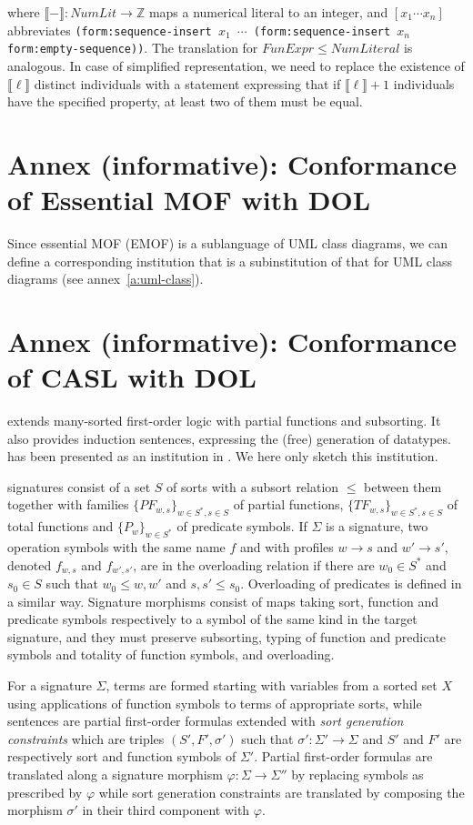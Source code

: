 \documentclass[10pt,fleqn,%
\ifpretendfinal
final%
\else
draft%
\fi,
]{scrreprt}
\newcommand{\infannex}[1]{ \chapter{Annex (informative): #1} }
\newcommand{\ZZ}{\mathbb{Z}}
\newcommand{\sem}[1]{\mathopen\llbracket#1\mathclose\rrbracket}
\begin{document}
%
where $\sem{-} : \mathit{NumLit} \to \ZZ$ maps a numerical literal
to an integer, and $[x_1\cdots x_n]$ abbreviates \texttt{(form:sequence-insert $x_1$ $\cdots$ (form:sequence-insert $x_n$ form:empty-sequence))}.
The translation for  $\mathit{FunExpr} \leq \mathit{NumLiteral}$
is analogous. In case of simplified representation, we need to replace
the existence of $\sem{\ell}$ distinct individuals with a statement
expressing that if $\sem{\ell}+1$ individuals have the specified property,
at least two of them must be equal.


\infannex{Conformance of Essential MOF with DOL}\label{a:EMOF}

Since essential MOF (EMOF) is a sublanguage of UML class diagrams,
we can define a corresponding institution that is a subinstitution
of that for UML class diagrams (see annex~\ref{a:uml-class}).


\infannex{Conformance of CASL with DOL}\label{a:casl}


\CASL \cite{CASL-RM} extends many-sorted first-order logic with
partial functions and subsorting.  It also provides induction
sentences, expressing the (free) generation of datatypes.  \CASL has
been presented as an institution in \cite{Mossakowski02,CASL-RM}. We
here only sketch this institution.

\CASL signatures consist of a set $S$ of sorts with a subsort relation $\leq$ between them
together with
families $\{PF_{w,s}\}_{w\in S^*, s\in S}$ of partial functions,
$\{TF_{w,s}\}_{w\in S^*, s\in S}$ of total functions and
$\{P_w\}_{w\in S^*}$ of predicate symbols. 
If $\Sigma$ is a signature, 
two operation symbols with the same name $f$ and with profiles
$w\rightarrow s$ and $w'\rightarrow s'$, denoted $f_{w,s}$ and $f_{w',s'}$, are in the
overloading relation if there are $w_0\in S^*$ and $s_0\in S$ such
that $w_0\leq w, w'$ and $s,s' \leq s_0$. Overloading of predicates is defined in a similar way.
Signature morphisms consist of maps taking sort, function and predicate symbols
respectively to a symbol of the same kind in the target signature, and they 
must preserve subsorting, typing of function and predicate symbols and totality of function symbols,
 and overloading. 

For a signature $\Sigma$, terms are formed starting with
variables from a sorted set $X$ using 
applications of function symbols to terms of appropriate sorts, while
sentences are partial first-order formulas extended with
\emph{sort generation constraints} which are triples $(S', F', \sigma')$ such that 
$\sigma':\Sigma'\rightarrow\Sigma$ and $S'$ and $F'$ are respectively sort and function symbols of
$\Sigma'$. 
Partial first-order formulas are translated along a signature morphism 
$\varphi:\Sigma\rightarrow\Sigma''$ by replacing symbols as prescribed by $\varphi$
while sort generation constraints are translated by
composing the morphism $\sigma'$ in their third component with $\varphi$.
\end{document}
